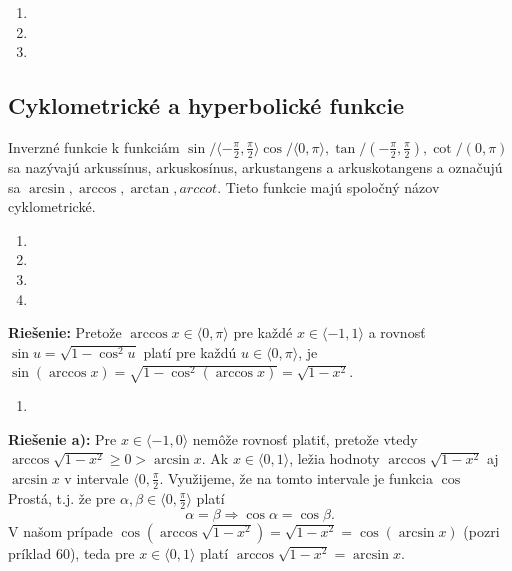 \begin{enumerate}[resume]
  \item {}
  \item {}
  \item {}
\end{enumerate}

\subsection{Cyklometrické a hyperbolické funkcie}

Inverzné funkcie k funkciám $\sin/\langle-\frac{\pi}{2},\frac{\pi}{2}\rangle \cos/\langle 0,\pi\rangle,\tan/(-\frac{\pi}{2},\frac{\pi}{2}),\cot/(0,\pi)$ sa nazývajú arkussínus, arkuskosínus, arkustangens a arkuskotangens a označujú sa $\arcsin,\arccos,\arctan,arccot$. Tieto funkcie majú spoločný názov cyklometrické.

\begin{enumerate}[resume]
  \item {}
  \item {}
  \item {}
  \item {}
\end{enumerate}

\textbf{Riešenie:} Pretože $\arccos x\in\langle 0,\pi\rangle$ pre každé $x\in\langle -1,1\rangle$ a rovnosť $\sin u=\sqrt{1-\cos^2 u}$ platí pre každú $u\in\langle 0,\pi\rangle$, je $\sin(\arccos x)=\sqrt{1-\cos^2(\arccos x)}=\sqrt{1-x^2}$.

\begin{enumerate}[resume]
  \item {}
\end{enumerate}

\textbf{Riešenie a):} Pre $x\in\langle-1,0\rangle$ nemôže rovnosť platiť, pretože vtedy $\arccos\sqrt{1-x^2}\geq 0>\arcsin x$. Ak $x\in\langle 0,1\rangle$, ležia hodnoty $\arccos\sqrt{1-x^2}$ aj $\arcsin x$ v intervale $\langle 0,\frac{\pi}{2}$. Využijeme, že na tomto intervale je funkcia $\cos$ Prostá, t.j. že pre $\alpha,\beta\in\langle 0,\frac{\pi}{2}\rangle$ platí $$\alpha=\beta\Rightarrow\cos\alpha=\cos\beta.$$
 V našom prípade $\cos(\arccos\sqrt{1-x^2})=\sqrt{1-x^2}=\cos(\arcsin x)$ (pozri príklad $60$), teda pre $x\in\langle 0,1\rangle$ platí $\arccos\sqrt{1-x^2}=\arcsin x$.

